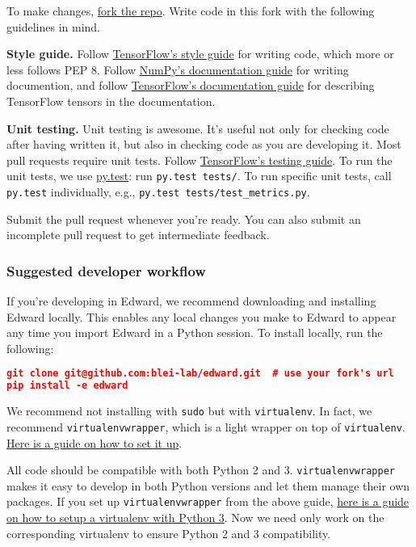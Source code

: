 To make changes,
\href{https://help.github.com/articles/working-with-forks/}{fork the repo}.
Write code in this fork with the following guidelines in mind.

\textbf{Style guide.}
Follow
\href{https://www.tensorflow.org/versions/master/how_tos/style_guide.html}{TensorFlow's
style guide}
for writing code, which more or less follows PEP 8.
Follow
\href{https://github.com/numpy/numpy/blob/master/doc/HOWTO_DOCUMENT.rst.txt}
{NumPy's documentation guide}
for writing documention,
and follow
\href{https://www.tensorflow.org/versions/master/how_tos/documentation/index.html}{TensorFlow's documentation guide}
for describing TensorFlow tensors in the documentation.

\textbf{Unit testing.}
Unit testing is awesome. It's useful not only
for checking code after having written it, but also in checking code
as you are developing it.
Most pull requests require unit tests.
Follow
\href{https://www.tensorflow.org/versions/master/api_docs/python/test.html}
{TensorFlow's testing guide}.
To run the unit tests, we use
\href{http://doc.pytest.org/}{py.test}:
run \texttt{py.test tests/}.
To run specific unit tests, call \texttt{py.test} individually, e.g., \texttt{py.test tests/test_metrics.py}.

Submit the pull request whenever you're ready. You can also submit an
incomplete pull request to get intermediate feedback.

\subsubsection{Suggested developer workflow}\label{suggested-workflow}

If you're developing in Edward,
we recommend downloading and installing Edward locally. This enables
any local changes you make to Edward to appear any time you
import Edward in a Python session. To install locally, run the
following:

\begin{lstlisting}[language=JSON]
git clone git@github.com:blei-lab/edward.git  # use your fork's url
pip install -e edward
\end{lstlisting}

We recommend not installing with \texttt{sudo} but with
\texttt{virtualenv}. In fact, we recommend
\texttt{virtualenvwrapper}, which is a light wrapper on top of
\texttt{virtualenv}.
\href{http://docs.python-guide.org/en/latest/starting/install/osx/}
{Here is a guide on how to set it up}.

All code should be compatible with both Python 2 and 3.
\texttt{virtualenvwrapper} makes it easy to develop in both Python versions
and let them manage their own packages.
If you set up \texttt{virtualenvwrapper} from the above guide,
\href{http://www.marinamele.com/2014/07/install-python3-on-mac-os-x-and-use-virtualenv-and-virtualenvwrapper.html}
{here is a guide on how to setup a virtualenv with Python 3}.
Now we need only work on the corresponding virtualenv to ensure Python
2 and 3 compatibility.
